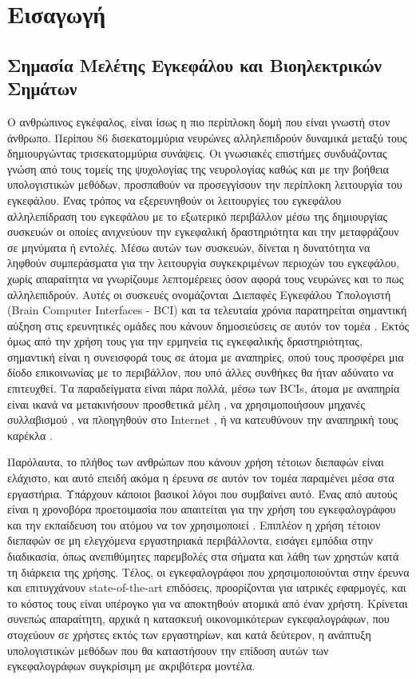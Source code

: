 \documentclass[11pt,a4paper,english,greek,twoside]{../Thesis}
\begin{document}
\chapter{Εισαγωγή}
\section{Σημασία Μελέτης Εγκεφάλου και Βιοηλεκτρικών Σημάτων}
\label{sec:importance}
Ο ανθρώπινος εγκέφαλος, είναι ίσως η πιο περίπλοκη δομή που είναι γνωστή στον άνθρωπο. Περίπου 86 δισεκατομμύρια νευρώνες \cite{Herculano-Houzel2009TheBrain} αλληλεπιδρούν δυναμικά μεταξύ τους δημιουργώντας τρισεκατομμύρια συνάψεις. Οι γνωσιακές επιστήμες συνδυάζοντας γνώση από τους τομείς της ψυχολογίας της νευρολογίας καθώς και με την βοήθεια υπολογιστικών μεθόδων, προσπαθούν να προσεγγίσουν την περίπλοκη λειτουργία του εγκεφάλου. Ένας τρόπος να εξερευνηθούν οι λειτουργίες του εγκεφάλου αλληλεπίδραση του εγκεφάλου με το εξωτερικό περιβάλλον μέσω της δημιουργίας συσκευών οι οποίες ανιχνεύουν την εγκεφαλική δραστηριότητα και την μεταφράζουν σε μηνύματα ή εντολές. Μέσω αυτών των συσκευών, δίνεται η δυνατότητα να ληφθούν συμπεράσματα για την λειτουργία συγκεκριμένων περιοχών του εγκεφάλου, χωρίς απαραίτητα να γνωρίζουμε λεπτομέρειες όσον αφορά τους νευρώνες και το πως αλληλεπιδρούν. Αυτές οι συσκευές ονομάζονται Διεπαφές Εγκεφάλου Υπολογιστή (Brain Computer Interfaces - BCI) και τα τελευταία χρόνια παρατηρείται σημαντική αύξηση στις ερευνητικές ομάδες που κάνουν δημοσιεύσεις σε αυτόν τον τομέα \cite{nicolas2012brain}. Εκτός όμως από την χρήση τους για την ερμηνεία τις εγκεφαλικής δραστηριότητας, σημαντική είναι η συνεισφορά τους σε άτομα με αναπηρίες, οπού τους προσφέρει μια δίοδο επικοινωνίας με το περιβάλλον, που υπό άλλες συνθήκες θα ήταν αδύνατο να επιτευχθεί. Τα παραδείγματα είναι πάρα πολλά, μέσω των BCIs, άτομα με αναπηρία είναι ικανά να μετακινήσουν προσθετικά μέλη \cite{}, να χρησιμοποιήσουν μηχανές συλλαβισμού , να πλοηγηθούν στο Internet \cite{}, ή να κατευθύνουν την αναπηρική τους καρέκλα \cite{}.  \cite{Farwell1988TalkingPotentials}
\par Παρόλαυτα, το πλήθος των ανθρώπων που κάνουν χρήση τέτοιων διεπαφών είναι ελάχιστο, και αυτό επειδή ακόμα η έρευνα σε αυτόν τον τομέα παραμένει μέσα στα εργαστήρια. Υπάρχουν κάποιοι βασικοί λόγοι που συμβαίνει αυτό. Ένας από αυτούς είναι η χρονοβόρα προετοιμασία που απαιτείται για την χρήση του εγκεφαλογράφου και την εκπαίδευση του ατόμου να τον χρησιμοποιεί \cite{blankertz2010berlin}. Επιπλέον η χρήση τέτοιον διεπαφών σε μη ελεγχόμενα εργαστηριακά περιβάλλοντα, εισάγει εμπόδια στην διαδικασία, όπως ανεπιθύμητες παρεμβολές στα σήματα και λάθη των χρηστών κατά τη διάρκεια της χρήσης. Τέλος, οι εγκεφαλογράφοι που χρησιμοποιούνται στην έρευνα και επιτυγχάνουν state-of-the-art επιδόσεις, προορίζονται για ιατρικές εφαρμογές, και το κόστος τους είναι υπέρογκο για να αποκτηθούν ατομικά από έναν χρήστη. Κρίνεται συνεπώς απαραίτητη, αρχικά η κατασκευή οικονομικότερων εγκεφαλογράφων, που στοχεύουν σε χρήστες εκτός των εργαστηρίων, και κατά δεύτερον, η ανάπτυξη υπολογιστικών μεθόδων που θα καταστήσουν την επίδοση αυτών των εγκεφαλογράφων συγκρίσιμη με ακριβότερα μοντέλα. 
\end{document}
